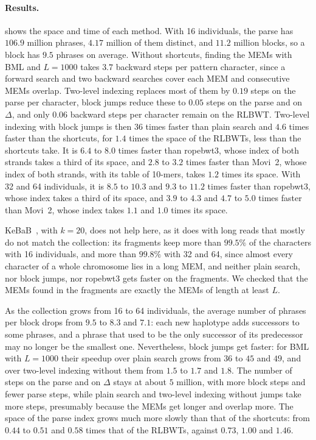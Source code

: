 \paragraph*{Results.}
 shows the space and time of each method. With 16
individuals, the parse has $106.9$ million phrases, $4.17$ million of
them distinct, and $11.2$ million blocks, so a block has $9.5$ phrases
on average. Without shortcuts, finding the MEMs with BML and $L = 1000$
takes $3.7$ backward steps per pattern character, since a forward search
and two backward searches cover each MEM and consecutive MEMs overlap.
Two-level indexing replaces most of them by $0.19$ steps on the parse
per character, block jumps reduce these to $0.05$ steps on the parse and
on $\Delta$, and only $0.06$ backward steps per character remain on the
RLBWT. Two-level indexing with block jumps is then $36$ times faster
than plain search and $4.6$ times faster than the shortcuts, for $1.4$
times the space of the RLBWTs, less than the shortcuts take. It is $6.4$
to $8.0$ times faster than ropebwt3, whose index of both strands takes a
third of its space, and $2.8$ to $3.2$ times faster than Movi~2, whose
index of both strands, with its table of 10-mers, takes $1.2$ times its
space. With 32 and 64 individuals, it is $8.5$ to $10.3$ and $9.3$ to
$11.2$ times faster than ropebwt3, whose index takes a third of its
space, and $3.9$ to $4.3$ and $4.7$ to $5.0$ times faster than Movi~2,
whose index takes $1.1$ and $1.0$ times its space.

KeBaB~\cite{BrownEtAl2025KeBaB}, with $k = 20$, does not help here,
as it does with long reads that mostly do not match the collection: its
fragments keep more than $99.5\%$ of the characters with 16 individuals,
and more than $99.8\%$ with 32 and 64, since almost every
character of a whole chromosome lies in a long MEM, and neither plain
search, nor block jumps, nor ropebwt3 gets faster on the fragments. We
checked that the MEMs found in the fragments are exactly the MEMs of
length at least $L$.

As the collection grows from 16 to 64 individuals, the average number of
phrases per block drops from $9.5$ to $8.3$ and $7.1$: each new
haplotype adds successors to some phrases, and a phrase that used to be
the only successor of its predecessor may no longer be the smallest one.
Nevertheless, block jumps get faster: for BML with $L = 1000$ their
speedup over plain search grows from $36$ to $45$ and $49$, and over
two-level indexing without them from $1.5$ to $1.7$ and $1.8$. The
number of steps on the parse and on $\Delta$ stays at about $5$ million,
with more block steps and fewer parse steps, while plain search and
two-level indexing without jumps take more steps, presumably because the
MEMs get longer and overlap more. The space of the parse index grows
much more slowly than that of the shortcuts: from $0.44$ to $0.51$ and
$0.58$ times that of the RLBWTs, against $0.73$, $1.00$ and $1.46$.
